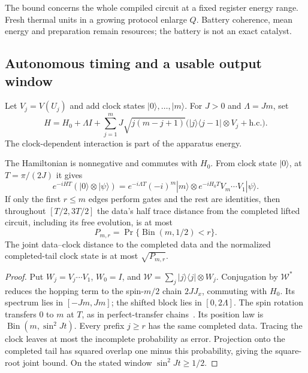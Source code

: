 The bound concerns the whole compiled circuit at a fixed register energy range.
Fresh thermal units in a growing protocol enlarge $Q$. Battery coherence,
mean energy and preparation remain resources; the battery is not an exact catalyst.

\subsection{Autonomous timing and a usable output window}

Let $V_j=V(U_j)$ and add clock states $|0\rangle,\ldots,|m\rangle$.
For $J>0$ and $\Lambda=Jm$, set
\begin{equation}\label{eq:positive-history-clock}
 H=H_0+\Lambda I+
 \sum_{j=1}^m J\sqrt{j(m-j+1)}
 \bigl(|j\rangle\langle j-1|\otimes V_j+\mathrm{h.c.}\bigr).
\end{equation}
The clock-dependent interaction is part of the apparatus energy.

\begin{proposition}
\label{prop:positive-history-clock}
The Hamiltonian is nonnegative and commutes with $H_0$. From clock state
$|0\rangle$, at $T=\pi/(2J)$ it gives
\[
 e^{-iHT}(|0\rangle\otimes|\psi\rangle)
 =e^{-i\Lambda T}(-i)^m|m\rangle\otimes
 e^{-iH_0T}V_m\cdots V_1|\psi\rangle .
\]
If only the first $r\le m$ edges perform gates and the rest are identities,
then throughout $[T/2,3T/2]$ the data's half trace distance from the completed
lifted circuit, including its free evolution, is at most
\begin{equation}\label{eq:idle-window}
 P_{m,r}=\Pr\{\operatorname{Bin}(m,1/2)<r\}.
\end{equation}
The joint data--clock distance to the completed data and the normalized
completed-tail clock state is at most $\sqrt{P_{m,r}}$.
\end{proposition}
\begin{proof}
Put $W_j=V_j\cdots V_1$, $W_0=I$, and
$\mathcal W=\sum_j|j\rangle\langle j|\otimes W_j$.
Conjugation by $\mathcal W^*$ reduces the hopping term to the spin-$m/2$
chain $2JJ_x$, commuting with $H_0$. Its spectrum lies in $[-Jm,Jm]$;
the shifted block lies in $[0,2\Lambda]$.
The spin rotation transfers $0$ to $m$ at $T$, as in perfect-transfer
chains~\cite{Christandl2004}. Its position law is
$\operatorname{Bin}(m,\sin^2 Jt)$. Every prefix $j\ge r$ has the
same completed data. Tracing the clock leaves at most the incomplete
probability as error. Projection onto the completed tail has squared
overlap one minus this probability, giving the square-root joint bound.
On the stated window $\sin^2 Jt\ge1/2$.
\end{proof}

